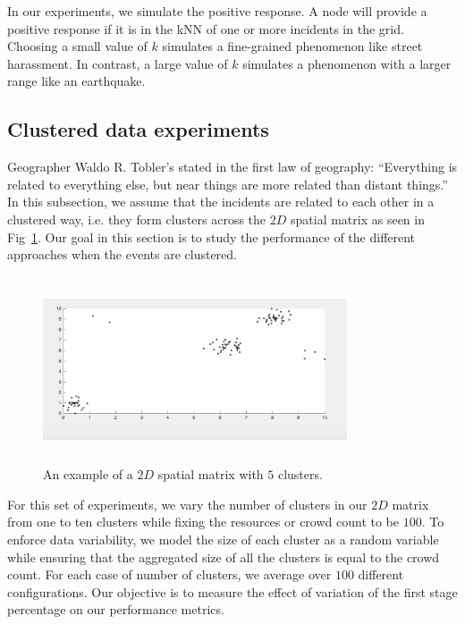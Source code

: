 \documentclass{acm_proc_article-sp}
\begin{document}
In our experiments, we simulate the positive response. A node will provide a positive response if it is in the kNN of one or more incidents in the grid. Choosing a small value of $k$ simulates a fine-grained phenomenon like street harassment. In contrast, a large value of $k$ simulates a phenomenon with a larger range like an earthquake. 
\subsection{Clustered data experiments}
Geographer Waldo R. Tobler's stated in the first law of geography: ``Everything is related to everything else, but near things are more related than distant things.'' In this subsection, we assume that the incidents are related to each other in a clustered way, i.e. they form clusters across the $2D$ spatial matrix as seen in Fig~\ref{fig: clust}. Our goal in this section is to study the performance of the different approaches when the events are clustered.\par
\begin{figure}[!h]
\centering
\includegraphics[width=9cm ,height=5.5cm]{figuresPng/clust.png}
\caption{An example of a $2D$ spatial matrix with $5$ clusters.}\label{fig: clust}
\end{figure}

For this set of experiments, we vary the number of clusters in our $2D$ matrix from one to ten clusters while fixing the resources or crowd count to be $100$. To enforce data variability, we model the size of each cluster as a random variable while ensuring that the aggregated size of all the clusters is equal to the crowd count. For each case of number of clusters, we average over $100$ different configurations. Our objective is to measure the effect of variation of the first stage percentage on our performance metrics.\par
\end{document}
